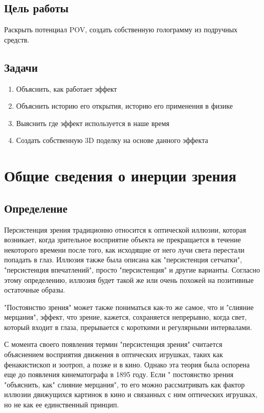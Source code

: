 \documentclass[a4paper, 12pt]{article}
\begin{document}
\subsection{Цель работы}
Раскрыть потенциал POV, создать собственную голограмму из подручных средств.
\subsection{Задачи}
\begin{enumerate}
	\item Объяснить, как работает эффект
	\item Объяснить историю его открытия, историю его применения в физике
	\item Выяснить где эффект используется в наше время
	\item Создать собственную 3D поделку на основе данного эффекта
\end{enumerate}
\newpage
\section{Общие сведения о инерции зрения}
\subsection{Определение}
Персистенция зрения традиционно относится к оптической иллюзии,
которая возникает, когда зрительное восприятие объекта не прекращается
в течение некоторого времени после того, как исходящие от него лучи света
перестали попадать в глаз. Иллюзия также была описана как
"персистенция сетчатки", "персистенция впечатлений", просто "персистенция"
и другие варианты. Согласно этому определению, иллюзия будет такой же
или очень похожей на позитивные остаточные образы.

"Постоянство зрения" может также пониматься как-то же самое,
что и "слияние мерцания", эффект, что зрение, кажется, сохраняется
непрерывно, когда свет, который входит в глаза, прерывается с короткими
и регулярными интервалами.

С момента своего появления термин "персистенция зрения" считается объяснением
восприятия движения в оптических игрушках, таких как фенакистископ и зоотроп,
а позже и в кино. Однако эта теория была оспорена еще до появления кинематографа
в 1895 году. Если " постоянство зрения "объяснить, как" слияние мерцания", то его
можно рассматривать как фактор иллюзии движущихся картинок в кино и связанных с ним
оптических игрушках, но не как ее единственный принцип.
\end{document}
